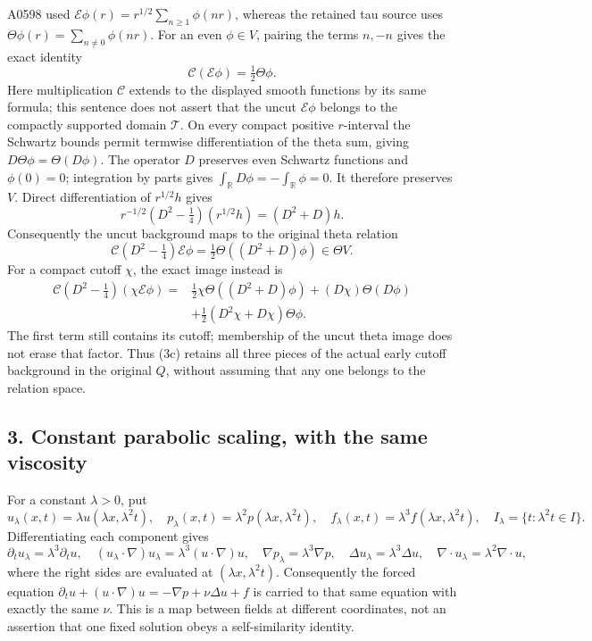 A0598 used \(\mathcal E\phi(r)=r^{1/2}\sum_{n\ge1}\phi(nr)\), whereas
the retained tau source uses \(\Theta\phi(r)=\sum_{n\ne0}\phi(nr)\). For
an even \(\phi\in V\), pairing the terms \(n,-n\) gives the exact
identity \[
\mathcal C(\mathcal E\phi)=\tfrac12\Theta\phi.
\tag{3a}
\] Here multiplication \(\mathcal C\) extends to the displayed smooth
functions by its same formula; this sentence does not assert that the
uncut \(\mathcal E\phi\) belongs to the compactly supported domain
\(\mathscr T\). On every compact positive \(r\)-interval the Schwartz
bounds permit termwise differentiation of the theta sum, giving
\(D\Theta\phi=\Theta(D\phi)\). The operator \(D\) preserves even
Schwartz functions and \(\phi(0)=0\); integration by parts gives
\(\int_\mathbb R D\phi=-\int_\mathbb R\phi=0\). It therefore preserves
\(V\). Direct differentiation of \(r^{1/2}h\) gives \[
r^{-1/2}(D^2-\tfrac14)(r^{1/2}h)=(D^2+D)h.
\] Consequently the uncut background maps to the original theta relation
\[
\mathcal C(D^2-\tfrac14)\mathcal E\phi=\tfrac12\Theta((D^2+D)\phi)\in\Theta V.
\tag{3b}
\] For a compact cutoff \(\chi\), the exact image instead is \[
\begin{aligned}
\mathcal C(D^2-\tfrac14)(\chi\mathcal E\phi)
={}&\tfrac12\chi\Theta((D^2+D)\phi)
+(D\chi)\Theta(D\phi)\\
&+\tfrac12(D^2\chi+D\chi)\Theta\phi.
\end{aligned}
\tag{3c}
\] The first term still contains its cutoff; membership of the uncut
theta image does not erase that factor. Thus (3c) retains all three
pieces of the actual early cutoff background in the original \(Q\),
without assuming that any one belongs to the relation space.

\subsection{3. Constant parabolic scaling, with the same
viscosity}\label{constant-parabolic-scaling-with-the-same-viscosity}

For a constant \(\lambda>0\), put \[
u_\lambda(x,t)=\lambda u(\lambda x,\lambda^2t),\quad
p_\lambda(x,t)=\lambda^2p(\lambda x,\lambda^2t),\quad
f_\lambda(x,t)=\lambda^3f(\lambda x,\lambda^2t),
\quad I_\lambda=\{t:\lambda^2t\in I\}.
\] Differentiating each component gives \[
\partial_tu_\lambda=\lambda^3\partial_tu,\quad
(u_\lambda\cdot\nabla)u_\lambda=\lambda^3(u\cdot\nabla)u,\quad
\nabla p_\lambda=\lambda^3\nabla p,\quad
\Delta u_\lambda=\lambda^3\Delta u,
\quad \nabla\cdot u_\lambda=\lambda^2\nabla\cdot u,
\] where the right sides are evaluated at \((\lambda x,\lambda^2t)\).
Consequently the forced equation
\(\partial_tu+(u\cdot\nabla)u=-\nabla p+\nu\Delta u+f\) is carried to
that same equation with exactly the same \(\nu\). This is a map between
fields at different coordinates, not an assertion that one fixed
solution obeys a self-similarity identity.

